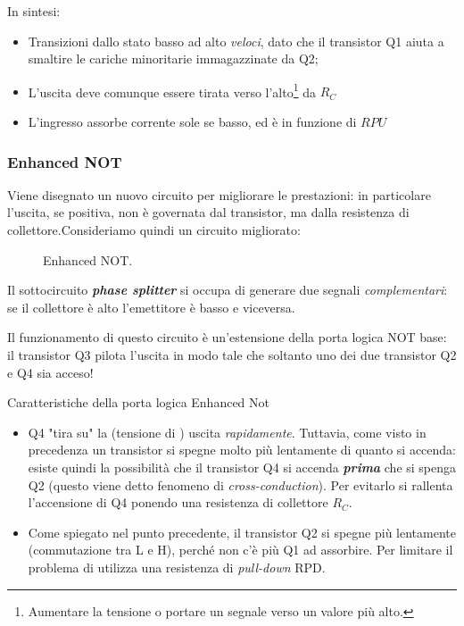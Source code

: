 \documentclass[
]{book}
\begin{document}
\begin{redbox}{In sintesi:}
\begin{itemize}
\item Transizioni dallo stato basso ad alto \emph{veloci}, dato che il transistor Q1 aiuta a smaltire le cariche minoritarie immagazzinate da Q2;
\item L'uscita deve comunque essere tirata verso l'alto\footnote{Aumentare la tensione o portare un segnale verso un valore più alto.} da $R_C$
\item L'ingresso assorbe corrente sole se basso, ed è in funzione di $RPU$
\end{itemize}
\end{redbox}

\subsubsection{Enhanced NOT}\label{enhanced-not}

Viene disegnato un nuovo circuito per migliorare le prestazioni: in
particolare l'uscita, se positiva, non è governata dal transistor, ma
dalla resistenza di collettore.\newline Consideriamo quindi un circuito
migliorato:

\begin{figure}[H]
    \centering
    \resizebox{0.6\textwidth}{!}{}
    \caption{Enhanced NOT.}
\end{figure}

Il sottocircuito \textbf{\emph{phase splitter}} si occupa di generare
due segnali \emph{complementari}: se il collettore è alto l'emettitore è
basso e viceversa.

Il funzionamento di questo circuito è un'estensione della porta logica
NOT base: il transistor Q3 pilota l'uscita in modo tale che soltanto uno
dei due transistor Q2 e Q4 sia acceso!

\begin{bluebox}{Caratteristiche della porta logica Enhanced Not}
\begin{itemize}
\item Q4 "tira su" la (tensione di ) uscita \emph{rapidamente}. Tuttavia, come visto in precedenza un transistor si spegne molto più lentamente di quanto si accenda: esiste quindi la possibilità che il transistor Q4 si accenda \emph{\textbf{prima}} che si spenga Q2 (questo viene detto fenomeno di \emph{cross-conduction}). Per evitarlo si rallenta l'accensione di Q4 ponendo una resistenza di collettore $R_C$.
\item Come spiegato nel punto precedente, il transistor Q2 si spegne più lentamente (commutazione tra L e H), perché non c'è più Q1 ad assorbire. Per limitare il problema di utilizza una resistenza di \emph{pull-down} RPD.
\end{itemize}
\end{bluebox}
\end{document}
